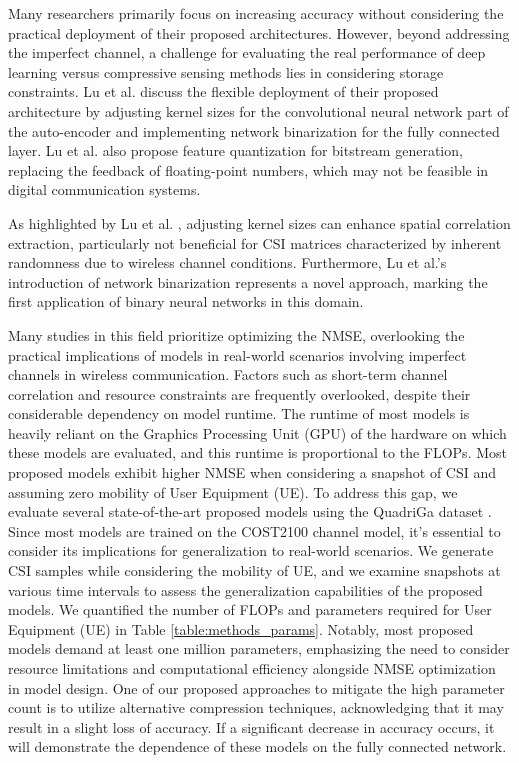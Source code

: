 \documentclass[lettersize,journal]{IEEEtran}
\begin{document}
Many researchers primarily focus on increasing accuracy without considering the practical deployment of their proposed architectures. However, beyond addressing the imperfect channel, a challenge for evaluating the real performance of deep learning versus compressive sensing methods lies in considering storage constraints. Lu et al. \cite{abp} discuss the flexible deployment of their proposed architecture by adjusting kernel sizes for the convolutional neural network part of the auto-encoder and implementing network binarization for the fully connected layer. Lu et al. \cite{abp} also propose feature quantization for bitstream generation, replacing the feedback of floating-point numbers, which may not be feasible in digital communication systems.

As highlighted by Lu et al. \cite{abp}, adjusting kernel sizes can enhance spatial correlation extraction, particularly not beneficial for CSI matrices characterized by inherent randomness due to wireless channel conditions. Furthermore, Lu et al.'s introduction \cite{abp} of network binarization represents a novel approach, marking the first application of binary neural networks \cite{aaa1} in this domain.

Many studies in this field prioritize optimizing the NMSE, overlooking the practical implications of models in real-world scenarios involving imperfect channels in wireless communication. Factors such as short-term channel correlation and resource constraints are frequently overlooked, despite their considerable dependency on model runtime. The runtime of most models is heavily reliant on the Graphics Processing Unit (GPU) of the hardware on which these models are evaluated, and this runtime is proportional to the FLOPs. Most proposed models exhibit higher NMSE when considering a snapshot of CSI and assuming zero mobility of User Equipment (UE). To address this gap, we evaluate several state-of-the-art proposed models using the QuadriGa dataset \cite{abu}. Since most models are trained on the COST2100 \cite{abf} channel model, it's essential to consider its implications for generalization to real-world scenarios. We generate CSI samples while considering the mobility of UE, and we examine snapshots at various time intervals to assess the generalization capabilities of the proposed models. We quantified the number of FLOPs and parameters required for User Equipment (UE) in Table \ref{table:methods_params}. Notably, most proposed models demand at least one million parameters, emphasizing the need to consider resource limitations and computational efficiency alongside NMSE optimization in model design. One of our proposed approaches to mitigate the high parameter count is to utilize alternative compression techniques, acknowledging that it may result in a slight loss of accuracy. If a significant decrease in accuracy occurs, it will demonstrate the dependence of these models on the fully connected network.
\end{document}
